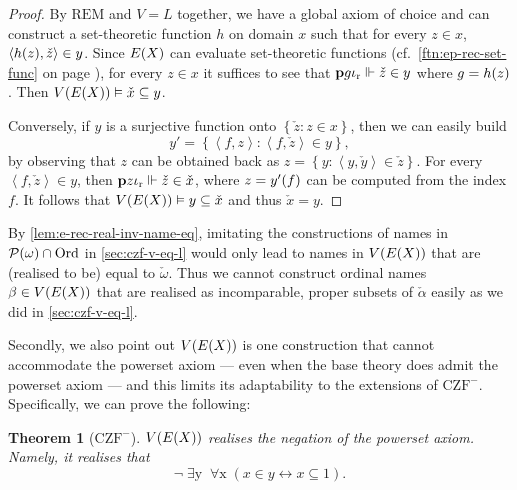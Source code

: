 \documentclass[12pt,openany]{book}
\theoremstyle{plain}
\newtheorem{theorem}{Theorem}[section]
\theoremstyle{definition}
\newcommand\tuple[1]{\left\langle #1 \right\rangle}
\newcommand\opA[1]{\mathop{\forall #1}}
\newcommand\opE[1]{\mathop{\exists #1}}
\newcommand\Pow{\mathcal{P}}
\newcommand\CZF{\mathrm{CZF}}
\newcommand\REM{\mathrm{REM}}
\newcommand\Ord{\mathrm{Ord}}
\newcommand\bp{\mathbf{p}}
\newcommand\ior{\iota_\textup{r}}
\begin{document}
\begin{proof}
  By $\REM$ and $V = L$ together, we have a global axiom of choice and can construct a set-theoretic function $h$ on domain $x$ such that for every $z \in x$, $\tuple{h\mleft(z\mright), \check{z}} \in y$. Since $E\mleft(X\mright)$ can evaluate set-theoretic functions (cf.\ \autoref{ftn:ep-rec-set-func} on page \pageref{ftn:ep-rec-set-func}), for every $z \in x$ it suffices to see that $\bp g \ior \Vdash \check{z} \in y$ where $g = h\mleft(z\mright)$. Then $V\mleft(E\mleft(X\mright)\mright) \vDash \check{x} \subseteq y$.

  Conversely, if $y$ is a surjective function onto $\left\{\check{z} : z \in x\right\}$, then we can easily build
  \[y' = \left\{\tuple{f, z} : \tuple{f, \check{z}} \in y\right\},\]
  by observing that $z$ can be obtained back as $z = \left\{y : \tuple{y, \check{y}} \in \check{z}\right\}$. For every $\tuple{f, \check{z}} \in y$, then $\bp z \ior \Vdash \check{z} \in \check{x}$, where $z = y'\mleft(f\mright)$ can be computed from the index $f$. It follows that $V\mleft(E\mleft(X\mright)\mright) \vDash y \subseteq \check{x}$ and thus $\check{x} = y$.
\end{proof}

By \autoref{lem:e-rec-real-inv-name-eq}, imitating the constructions of names in $\Pow\mleft(\omega\mright) \cap \Ord$ in \autoref{sec:czf-v-eq-l} would only lead to names in $V\mleft(E\mleft(X\mright)\mright)$ that are (realised to be) equal to $\check{\omega}$. Thus we cannot construct ordinal names $\beta \in V\mleft(E\mleft(X\mright)\mright)$ that are realised as incomparable, proper subsets of $\check{\alpha}$ easily as we did in \autoref{sec:czf-v-eq-l}.

Secondly, we also point out $V\mleft(E\mleft(X\mright)\mright)$ is one construction that cannot accommodate the powerset axiom --- even when the base theory does admit the powerset axiom --- and this limits its adaptability to the extensions of $\CZF^-$. Specifically, we can prove the following:
\begin{theorem}[$\CZF^-$]
  $V\mleft(E\mleft(X\mright)\mright)$ realises the negation of the powerset axiom. Namely, it realises that
  \[\neg\!\opE{y} \opA{x} \left(x \in y \leftrightarrow x \subseteq 1\right).\]
\end{theorem}
\end{document}

